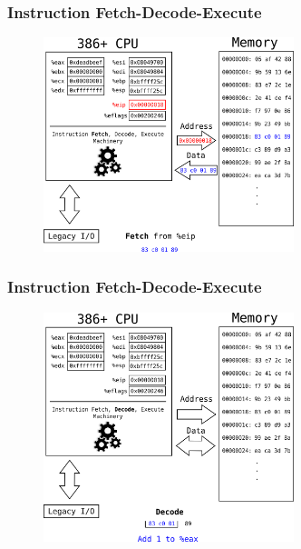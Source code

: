 \documentclass[11pt,xcolor=dvipsnames]{beamer}
\newcommand{\mvs}{\vspace{-0.95em}}
\begin{document}
\begin{frame}[fragile,t]
\frametitle{Instruction Fetch-Decode-Execute}
\mvs
\begin{figure}
\centering \includegraphics[width=0.65\textwidth]{figures/386fetch_decode_execute1.png}
\end{figure}
\end{frame}

\begin{frame}[fragile,t]
\frametitle{Instruction Fetch-Decode-Execute}
\mvs
\begin{figure}
\centering \includegraphics[width=0.65\textwidth]{figures/386fetch_decode_execute2.png}
\end{figure}
\end{frame}
\end{document}
